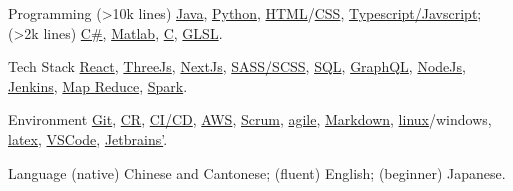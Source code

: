 
\begin{cvskills}
  \cvskill
    {Programming}
    {(>10k lines) \href{https://www.java.com/en/}{Java}, \href{https://www.python.org/}{Python}, \href{https://developer.mozilla.org/en-US/docs/Glossary/HTML5}{HTML}/\href{https://developer.mozilla.org/en-US/docs/Web/CSS}{CSS}, \href{https://www.javascript.com/}{Typescript/Javscript}; (>2k lines) \href{https://learn.microsoft.com/en-us/dotnet/csharp/tour-of-csharp/}{C\#}, \href{https://uk.mathworks.com/products/matlab.html}{Matlab}, \href{https://en.wikipedia.org/wiki/C_(programming_language)}{C}, \href{https://www.khronos.org/opengl/wiki/OpenGL_Shading_Language}{GLSL}.}

  \cvskill
    {Tech Stack} %
    {\href{https://reactjs.org/}{React}, \href{https://threejs.org/}{ThreeJs}, \href{https://nextjs.org/}{NextJs}, \href{https://sass-lang.com/}{SASS/SCSS}, \href{https://en.wikipedia.org/wiki/SQL}{SQL}, \href{https://graphql.org/}{GraphQL}, \href{https://nodejs.org/en/}{NodeJs}, \href{https://www.jenkins.io/}{Jenkins}, \href{https://en.wikipedia.org/wiki/MapReduce}{Map Reduce}, \href{https://spark.apache.org/}{Spark}.}  %



  \cvskill
    {Environment} %
    {\href{https://git-scm.com/}{Git}, \href{https://en.wikipedia.org/wiki/Code_review}{CR}, \href{https://www.redhat.com/en/topics/devops/what-is-ci-cd}{CI/CD}, \href{https://aws.amazon.com/}{AWS}, \href{https://www.scrum.org/resources/what-is-scrum}{Scrum}, \href{https://www.atlassian.com/agile}{agile}, \href{https://en.wikipedia.org/wiki/Markdown}{Markdown}, \href{https://en.wikipedia.org/wiki/Unix}{linux}/windows, \href{https://www.latex-project.org/}{latex}, \href{https://code.visualstudio.com/}{VSCode}, \href{https://www.jetbrains.com/}{Jetbrains'}.}

  \cvskill
    {Language}
    {(native) Chinese and Cantonese; (fluent) English; (beginner) Japanese.}

  
\end{cvskills}

